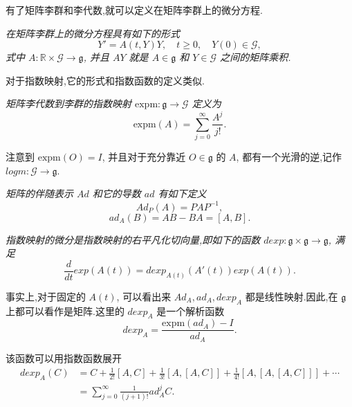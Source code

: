 有了矩阵李群和李代数,就可以定义在矩阵李群上的微分方程.
\begin{definition}
	\emph{在矩阵李群上的微分方程具有如下的形式
	\begin{equation*}
		Y'=A(t,Y)Y,\quad t\geq 0,\quad Y(0)\in \mathcal{G},
	\end{equation*}
	式中 $A:\mathbb{R}\times \mathcal{G}\to \mathfrak{g}$, 并且 $AY$ 就是 $A\in \mathfrak{g}$ 和 $Y\in \mathcal{G}$ 之间的矩阵乘积.}
\end{definition}

对于指数映射,它的形式和指数函数的定义类似.
\begin{definition}
	\emph{矩阵李代数到李群的指数映射 $\mbox{expm}:\mathfrak{g}\to\mathcal{G}$ 定义为
	\begin{equation*}
		\mbox{expm}(A)=\sum_{j=0}^{\infty}\frac{A^j}{j!}.
	\end{equation*}}
\end{definition}

注意到 $\mbox{expm}(O)=I$, 并且对于充分靠近 $O\in \mathfrak{g}$ 的 $A$, 都有一个光滑的逆,记作 $logm:\mathcal{G}\to\mathfrak{g}$.

\begin{definition}
	\emph{矩阵的伴随表示 $Ad$ 和它的导数 $ad$ 有如下定义
	\begin{equation*}
		Ad_P(A)=PAP^{-1},
	\end{equation*}
	\begin{equation*}
		ad_A(B)=AB-BA=[A,B].
	\end{equation*}}
\end{definition}

\begin{definition}
	\emph{指数映射的微分是指数映射的右平凡化切向量,即如下的函数 $dexp:\mathfrak{g}\times \mathfrak{g}\to \mathfrak{g}$, 满足
	\begin{equation*}
		\frac{d}{dt}exp(A(t))=dexp_{A(t)}(A'(t))exp(A(t)).
	\end{equation*}}
\end{definition}

事实上,对于固定的 $A(t)$, 可以看出来 $Ad_A,ad_A,dexp_A$ 都是线性映射.因此,在 $\mathfrak{g}$ 上都可以看作是矩阵.这里的 $dexp_A$ 是一个解析函数
\begin{equation*}
	dexp_A=\frac{\mbox{expm}(ad_A)-I}{ad_A}.
\end{equation*}

该函数可以用指数函数展开
\begin{equation*}
	\begin{aligned}
		dexp_A(C)&=C+\frac{1}{2!}[A,C]+\frac{1}{3!}[A,[A,C]]+\frac{1}{4!}[A,[A,[A,C]]]+\cdots\\
		&=\sum_{j=0}^{\infty}\frac{1}{(j+1)!}ad^j_AC.
	\end{aligned}
\end{equation*}

